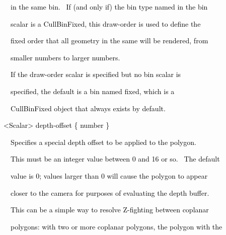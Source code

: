 \documentclass[a4paper]{article}
\newcommand\textstyleOOoComputerKeyWord[1]{\textrm{\textcolor[rgb]{0.0,0.0,0.5019608}{#1}}}
\begin{document}
{\color{black}
\textstyleOOoComputerKeyWord{\textcolor{black}{\ \ \ \ in the same bin. \ If (and only if) the bin type named in the
bin}}}

{\color{black}
\textstyleOOoComputerKeyWord{\textcolor{black}{\ \ \ \ scalar is a CullBinFixed, this draw-order is used to define
the}}}

{\color{black}
\textstyleOOoComputerKeyWord{\textcolor{black}{\ \ \ \ fixed order that all geometry in the same will be rendered,
from}}}

{\color{black}
\textstyleOOoComputerKeyWord{\textcolor{black}{\ \ \ \ smaller numbers to larger numbers.}}}


\bigskip

{\color{black}
\textstyleOOoComputerKeyWord{\textcolor{black}{\ \ \ \ If the draw-order scalar is specified but no bin scalar is}}}

{\color{black}
\textstyleOOoComputerKeyWord{\textcolor{black}{\ \ \ \ specified, the default is a bin named
{\textquotedbl}fixed{\textquotedbl}, which is a}}}

{\color{black}
\textstyleOOoComputerKeyWord{\textcolor{black}{\ \ \ \ CullBinFixed object that always exists by default.}}}


\bigskip

{\color{black}
\textstyleOOoComputerKeyWord{\textcolor{black}{\ \ {\textless}Scalar{\textgreater} depth-offset \{ number \}}}}


\bigskip

{\color{black}
\textstyleOOoComputerKeyWord{\textcolor{black}{\ \ \ \ Specifies a special depth offset to be applied to the polygon.}}}

{\color{black}
\textstyleOOoComputerKeyWord{\textcolor{black}{\ \ \ \ This must be an integer value between 0 and 16 or so. \ The
default}}}

{\color{black}
\textstyleOOoComputerKeyWord{\textcolor{black}{\ \ \ \ value is 0; values larger than 0 will cause the polygon to
appear}}}

{\color{black}
\textstyleOOoComputerKeyWord{\textcolor{black}{\ \ \ \ closer to the camera for purposes of evaluating the depth
buffer.}}}

{\color{black}
\textstyleOOoComputerKeyWord{\textcolor{black}{\ \ \ \ This can be a simple way to resolve Z-fighting between
coplanar}}}

{\color{black}
\textstyleOOoComputerKeyWord{\textcolor{black}{\ \ \ \ polygons: with two or more coplanar polygons, the polygon with
the}}}
\end{document}
